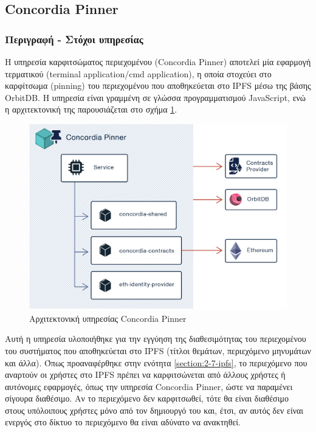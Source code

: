 \subsection{Concordia Pinner} \label{subsection:4-3-4-concordia-pinner-service}

\subsubsection{Περιγραφή - Στόχοι υπηρεσίας}

Η υπηρεσία καρφιτσώματος περιεχομένου (Concordia Pinner) αποτελεί μία εφαρμογή τερματικού (terminal application/cmd application), η οποία στοχεύει στο καρφίτσωμα (pinning) του περιεχομένου που αποθηκεύεται στο IPFS μέσω της βάσης OrbitDB. Η υπηρεσία είναι γραμμένη σε γλώσσα προγραμματισμού JavaScript, ενώ η αρχιτεκτονική της παρουσιάζεται στο σχήμα \ref{figure:4-3-concordia-pinner-architecture}.

\vspace{.5\baselineskip}

\begin{figure}[H]
    \centering
    \includegraphics[width=.75\textwidth]{assets/figures/chapter-4/4.3.architecture-4.3.4.concordia-pinner-architecture}
    \caption{Αρχιτεκτονική υπηρεσίας Concordia Pinner}
    \label{figure:4-3-concordia-pinner-architecture}
\end{figure}

Αυτή η υπηρεσία υλοποιήθηκε για την εγγύηση της διαθεσιμότητας του περιεχομένου του συστήματος που αποθηκεύεται στο IPFS (τίτλοι θεμάτων, περιεχόμενο μηνυμάτων και άλλα). Όπως προαναφέρθηκε στην ενότητα \ref{section:2-7-ipfs}, το περιεχόμενο που αναρτούν οι χρήστες στο IPFS πρέπει να καρφιτσώνεται από άλλους χρήστες ή αυτόνομες εφαρμογές, όπως την υπηρεσία Concordia Pinner, ώστε να παραμένει σίγουρα διαθέσιμο. Αν το περιεχόμενο δεν καρφιτσωθεί, τότε θα είναι διαθέσιμο στους υπόλοιπους χρήστες μόνο από
τον δημιουργό του και, έτσι, αν αυτός δεν είναι ενεργός στο δίκτυο το περιεχόμενο θα είναι αδύνατο να ανακτηθεί.

